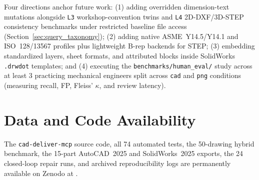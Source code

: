 \documentclass[nocopyright,nolists,upint,varvw,hyphenate]{asmejour}
\begin{document}
Four directions anchor future work: (1) adding overridden dimension-text mutations alongside \texttt{L3} workshop-convention twins and \texttt{L4} 2D-DXF/3D-STEP consistency benchmarks under restricted baseline file access (Section~\ref{sec:query_taxonomy}); (2) adding native ASME~Y14.5/Y14.1 and ISO~128/13567 profiles plus lightweight B-rep backends for STEP; (3) embedding standardized layers, sheet formats, and attributed blocks inside SolidWorks \texttt{.drwdot} templates; and (4) executing the \texttt{benchmarks/human\_eval/} study across at least 3 practicing mechanical engineers split across \texttt{cad} and \texttt{png} conditions (measuring recall, FP, Fleiss' $\kappa$, and review latency).

\section*{Data and Code Availability}

The \texttt{cad-deliver-mcp} source code, all 74 automated tests, the 50-drawing hybrid benchmark, the 15-part AutoCAD~2025 and SolidWorks~2025 exports, the 24 closed-loop repair runs, and archived reproducibility logs are permanently available on Zenodo at .

\vspace{-4pt}

\setlength\bibsep{-1.8pt}

\end{document}
